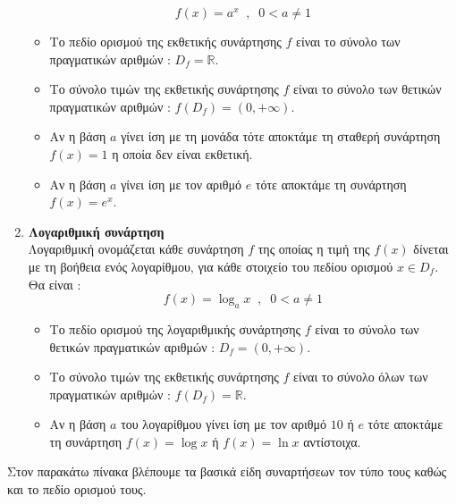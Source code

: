 \documentclass[twoside,10pt]{book}
\begin{document}
\begin{enumerate}[itemsep=0mm,label=\bf\arabic*.]
\[ f(x)=a^x\;\;,\;\;0<a\neq1 \]
\begin{itemize}
\item Το πεδίο ορισμού της εκθετικής συνάρτησης $ f $ είναι το σύνολο των πραγματικών αριθμών : $ D_f=\mathbb{R} $.
\item Το σύνολο τιμών της εκθετικής συνάρτησης $ f $ είναι το σύνολο των θετικών πραγματικών αριθμών : $ f\left( D_f\right) =(0,+\infty) $.
\item Αν η βάση $ a $ γίνει ίση με τη μονάδα τότε αποκτάμε τη σταθερή συνάρτηση $ f(x)=1 $ η οποία δεν είναι εκθετική.
\item Αν η βάση $ a $ γίνει ίση με τον αριθμό $ e $ τότε αποκτάμε τη συνάρτηση $ f(x)=e^x $.
\end{itemize}
\item \textbf{Λογαριθμική συνάρτηση}\\
Λογαριθμική ονομάζεται κάθε συνάρτηση $ f $ της οποίας η τιμή της $ f(x) $ δίνεται με τη βοήθεια ενός λογαρίθμου, για κάθε στοιχείο του πεδίου ορισμού $ x\in D_f $. Θα είναι :
\[ f(x)=\log_ax\;\;,\;\;0<a\neq1 \]
\begin{itemize}
\item Το πεδίο ορισμού της λογαριθμικής συνάρτησης $ f $ είναι το σύνολο των θετικών πραγματικών αριθμών : $ D_f=(0,+\infty) $.
\item Το σύνολο τιμών της εκθετικής συνάρτησης $ f $ είναι το σύνολο όλων των πραγματικών αριθμών : $ f\left( D_f\right) =\mathbb{R} $.
\item Αν η βάση $ a $ του λογαρίθμου γίνει ίση με τον αριθμό $ 10 $ ή $ e $ τότε αποκτάμε τη συνάρτηση $ f(x)=\log{x} $ ή $ f(x)=\ln{x} $ αντίστοιχα.
\end{itemize}
\end{enumerate}
Στον παρακάτω πίνακα βλέπουμε τα βασικά είδη συναρτήσεων τον τύπο τους καθώς και το πεδίο ορισμού τους.
\end{document}
